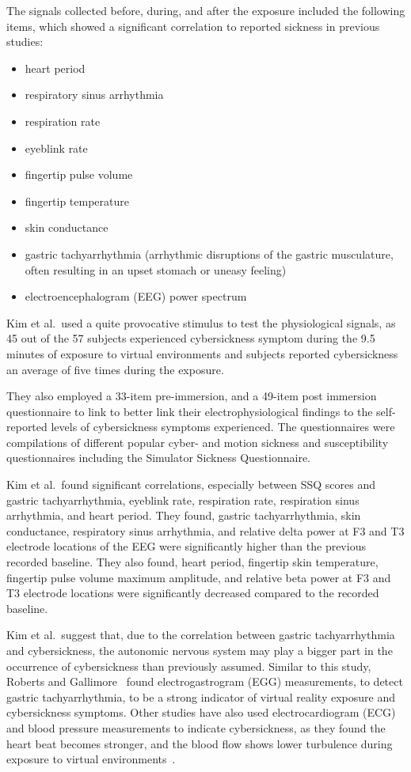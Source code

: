 The signals collected before, during, and after the exposure included the following items, which showed a significant
correlation to reported sickness in previous studies:
\begin{itemize}
    \item heart period
    \item respiratory sinus arrhythmia
    \item respiration rate
    \item eyeblink rate
    \item fingertip pulse volume
    \item fingertip temperature
    \item skin conductance
    \item gastric tachyarrhythmia (arrhythmic disruptions of the gastric musculature, often resulting in an upset
    stomach or uneasy feeling)
    \item electroencephalogram (EEG) power spectrum
\end{itemize}
Kim et al.\ used a quite provocative stimulus to test the physiological signals, as 45 out of the 57 subjects
experienced cybersickness symptom during the 9.5 minutes of exposure to virtual environments and subjects reported
cybersickness an average of five times during the exposure.

They also employed a 33-item pre-immersion, and a 49-item post immersion questionnaire to link to better link their
electrophysiological findings to the self-reported levels of cybersickness symptoms experienced.
The questionnaires were compilations of different popular cyber- and motion sickness and susceptibility questionnaires
including the Simulator Sickness Questionnaire.

Kim et al.\ found significant correlations, especially between SSQ scores and gastric tachyarrhythmia, eyeblink rate,
respiration rate, respiration sinus arrhythmia, and heart period.
They found, gastric tachyarrhythmia, skin conductance, respiratory sinus arrhythmia, and relative delta power at F3
and T3 electrode locations of the EEG were significantly higher than the previous recorded baseline.
They also found, heart period, fingertip skin temperature, fingertip pulse volume maximum amplitude, and relative
beta power at F3 and T3 electrode locations were significantly decreased compared to the recorded baseline.

Kim et al.\ suggest that, due to the correlation between gastric tachyarrhythmia and cybersickness, the autonomic
nervous system may play a bigger part in the occurrence of cybersickness than previously assumed.
Similar to this study, Roberts and Gallimore~\cite{Roberts2005} found electrogastrogram (EGG) measurements, to detect
gastric tachyarrhythmia, to be a strong indicator of virtual reality exposure and cybersickness symptoms.
Other studies have also used electrocardiogram (ECG) and blood pressure measurements to indicate cybersickness, as 
they found the heart beat becomes stronger, and the blood flow shows lower turbulence during exposure to virtual
environments~\cite{Kiryu2007, Watanabe2008}.


